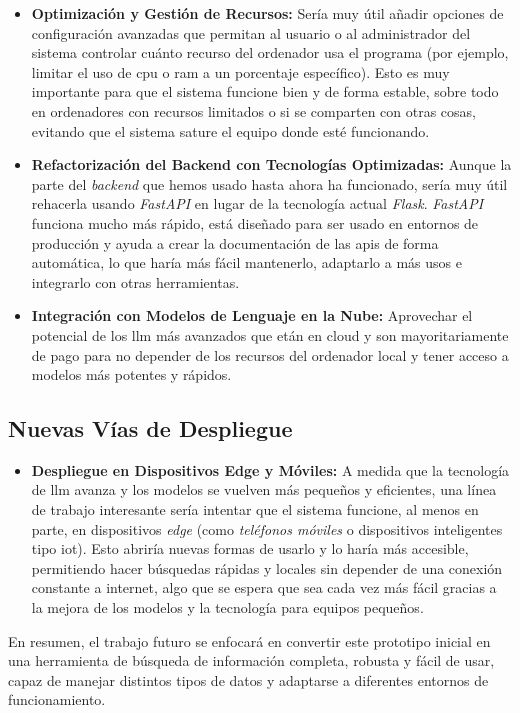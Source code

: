 \begin{itemize}
    \item \textbf{Optimización y Gestión de Recursos:} Sería muy útil añadir opciones de configuración avanzadas que permitan al usuario o al administrador del sistema controlar cuánto recurso del ordenador usa el programa (por ejemplo, limitar el uso de \gls{cpu} o \gls{ram} a un porcentaje específico). Esto es muy importante para que el sistema funcione bien y de forma estable, sobre todo en ordenadores con recursos limitados o si se comparten con otras cosas, evitando que el sistema sature el equipo donde esté funcionando.
    \item \textbf{Refactorización del Backend con Tecnologías Optimizadas:} Aunque la parte del \textit{backend} que hemos usado hasta ahora ha funcionado, sería muy útil rehacerla usando \textit{FastAPI} en lugar de la tecnología actual \textit{Flask}. \textit{FastAPI} funciona mucho más rápido, está diseñado para ser usado en entornos de producción y ayuda a crear la documentación de las \gls{api}s de forma automática, lo que haría más fácil mantenerlo, adaptarlo a más usos e integrarlo con otras herramientas.
    \item \textbf{Integración con Modelos de Lenguaje en la Nube:} Aprovechar el potencial de los \gls{llm} más avanzados que etán en cloud y son mayoritariamente de pago para no depender de los recursos del ordenador local y tener acceso a modelos más potentes y rápidos.
\end{itemize}

\subsection{Nuevas Vías de Despliegue}

\begin{itemize}
    \item \textbf{Despliegue en Dispositivos Edge y Móviles:} A medida que la tecnología de \gls{llm} avanza y los modelos se vuelven más pequeños y eficientes, una línea de trabajo interesante sería intentar que el sistema funcione, al menos en parte, en dispositivos \textit{edge} (como \textit{teléfonos móviles} o dispositivos inteligentes tipo \gls{iot}). Esto abriría nuevas formas de usarlo y lo haría más accesible, permitiendo hacer búsquedas rápidas y locales sin depender de una conexión constante a internet, algo que se espera que sea cada vez más fácil gracias a la mejora de los modelos y la tecnología para equipos pequeños.
\end{itemize}

En resumen, el trabajo futuro se enfocará en convertir este prototipo inicial en una herramienta de búsqueda de información completa, robusta y fácil de usar, capaz de manejar distintos tipos de datos y adaptarse a diferentes entornos de funcionamiento.
